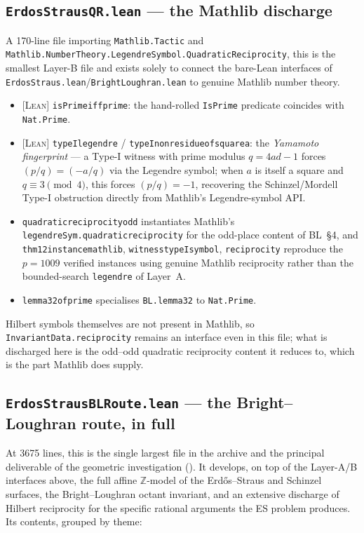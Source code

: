 \documentclass[11pt]{article}
\theoremstyle{plain}
\theoremstyle{definition}
\theoremstyle{remark}
\newcommand{\LEAN}{\textcolor{proved}{\textsc{[Lean]}}}
\newcommand{\file}[1]{\texttt{#1}}
\newcommand{\lean}[1]{\texttt{#1}}
\renewcommand{\_}{\textunderscore\allowbreak}
\newcommand{\Z}{\mathbb{Z}}
\begin{document}
\subsection{\file{ErdosStrausQR.lean} — the Mathlib discharge}
\label{subsec:erdosstrausqr-lean}

A 170-line file importing \texttt{Mathlib.Tactic} and
\texttt{Mathlib.NumberTheory.\allowbreak LegendreSymbol.\allowbreak QuadraticReciprocity}, this is the smallest
Layer-B file and exists solely to connect the bare-Lean interfaces of
\file{ErdosStraus.lean}/\file{BrightLoughran.lean} to genuine Mathlib number theory.
\begin{itemize}[leftmargin=1.4em]
  \item \LEAN{} \lean{isPrime\_iff\_prime}: the hand-rolled \lean{IsPrime} predicate coincides
        with \lean{Nat.Prime}.
  \item \LEAN{} \lean{typeI\_legendre} / \lean{typeI\_nonresidue\_of\_square\_a}: the
        \emph{Yamamoto fingerprint} — a Type-I witness with prime modulus $q=4ad-1$ forces
        $(p/q)=(-a/q)$ via the Legendre symbol; when $a$ is itself a square and
        $q\equiv3\pmod4$, this forces $(p/q)=-1$, recovering the Schinzel/Mordell Type-I
        obstruction directly from Mathlib's Legendre-symbol API.
  \item \lean{quadratic\_reciprocity\_odd} instantiates Mathlib's
        \lean{legendreSym.quadratic\_reciprocity} for the odd-place content of BL~\S4, and
        \lean{thm12\_instance\_1009\_mathlib}, \lean{witness\_1009\_typeI\_symbol},
        \lean{reciprocity\_1009\_11} reproduce the $p=1009$ verified instances using genuine
        Mathlib reciprocity rather than the bounded-search \lean{legendre} of Layer~A.
  \item \lean{lemma32\_of\_prime} specialises \lean{BL.lemma32} to \lean{Nat.Prime}.
\end{itemize}
Hilbert symbols themselves are not present in Mathlib, so \lean{InvariantData.reciprocity}
remains an interface even in this file; what is discharged here is the odd--odd quadratic
reciprocity content it reduces to, which is the part Mathlib does supply.

\subsection{\file{ErdosStrausBLRoute.lean} — the Bright--Loughran route, in full}
\label{subsec:blroute-lean}

At 3675 lines, this is the single largest file in the archive and the principal deliverable of
the geometric investigation (). It develops, on top of the Layer-A/B interfaces
above, the full affine $\Z$-model of the Erd\H{o}s--Straus and Schinzel surfaces, the
Bright--Loughran octant invariant, and an extensive discharge of Hilbert reciprocity for the
specific rational arguments the ES problem produces. Its contents, grouped by theme:
\end{document}
